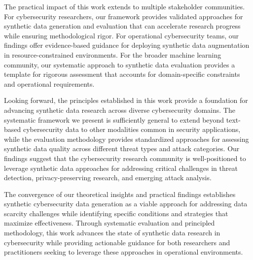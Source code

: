 The practical impact of this work extends to multiple stakeholder communities. For cybersecurity researchers, our framework provides validated approaches for synthetic data generation and evaluation that can accelerate research progress while ensuring methodological rigor. For operational cybersecurity teams, our findings offer evidence-based guidance for deploying synthetic data augmentation in resource-constrained environments. For the broader machine learning community, our systematic approach to synthetic data evaluation provides a template for rigorous assessment that accounts for domain-specific constraints and operational requirements.

Looking forward, the principles established in this work provide a foundation for advancing synthetic data research across diverse cybersecurity domains. The systematic framework we present is sufficiently general to extend beyond text-based cybersecurity data to other modalities common in security applications, while the evaluation methodology provides standardized approaches for assessing synthetic data quality across different threat types and attack categories. Our findings suggest that the cybersecurity research community is well-positioned to leverage synthetic data approaches for addressing critical challenges in threat detection, privacy-preserving research, and emerging attack analysis.

The convergence of our theoretical insights and practical findings establishes synthetic cybersecurity data generation as a viable approach for addressing data scarcity challenges while identifying specific conditions and strategies that maximize effectiveness. Through systematic evaluation and principled methodology, this work advances the state of synthetic data research in cybersecurity while providing actionable guidance for both researchers and practitioners seeking to leverage these approaches in operational environments.